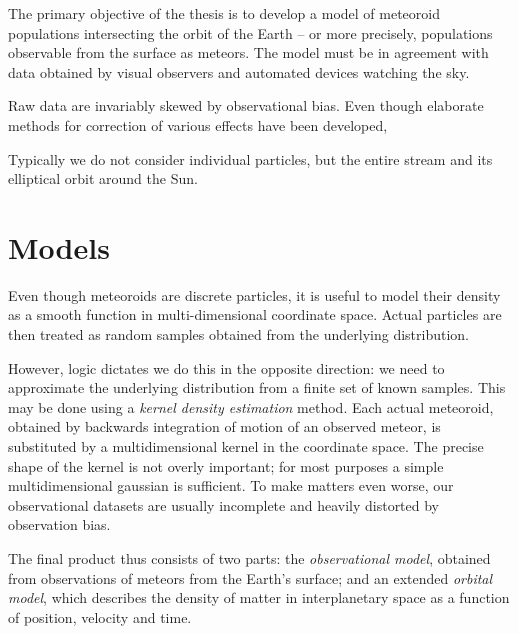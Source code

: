 
The primary objective of the thesis is to develop a model of meteoroid populations intersecting
the orbit of the Earth -- or more precisely, populations observable from the surface as meteors.
The model must be in agreement with data obtained by visual observers and automated devices watching the sky.

Raw data are invariably skewed by observational bias. Even though elaborate methods for correction of various
effects have been developed,


Typically we do not consider individual particles, but the entire stream and its elliptical orbit around the Sun.

\section{Models}
    Even though meteoroids are discrete particles, it is useful to model their density
    as a smooth function in multi-dimensional coordinate space.
    Actual particles are then treated as random samples obtained from the underlying distribution.

    However, logic dictates we do this in the opposite direction: we need to approximate
    the underlying distribution from a finite set of known samples.
    This may be done using a \emph{kernel density estimation} method.
    Each actual meteoroid, obtained by backwards integration of motion of an observed meteor,
    is substituted by a multidimensional kernel in the coordinate space. The precise shape of the kernel
    is not overly important; for most purposes a simple multidimensional gaussian is sufficient.
    To make matters even worse, our observational datasets are usually incomplete
    and heavily distorted by observation bias.

    The final product thus consists of two parts: the \emph{observational model},
    obtained from observations of meteors from the Earth's surface;
    and an extended \emph{orbital model}, which describes the density of matter
    in interplanetary space as a function of position, velocity and time.

